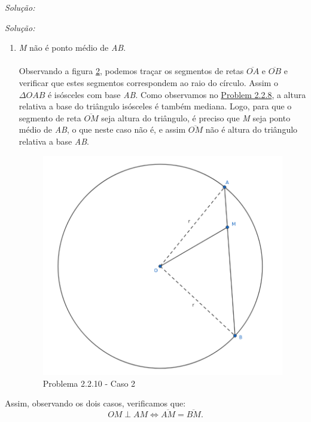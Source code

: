 \documentclass[a4paper, 11pt]{book}
\newenvironment{solution}
    {\textit{Solução:}}
    {}
\begin{document}
\begin{solution}
{\begin{solution}
\begin{enumerate}
\begin{figure}[H]
                \caption{Problema 2.2.10 - Caso 1}
                \label{fig:2.2.10}
            \end{figure}
        \item \textit{M} não é ponto médio de \textit{AB}. \\\\
            Observando a figura \ref{fig:2.2.10.2}, podemos traçar os segmentos de retas $\overline{OA}$ e $\overline{OB}$ e verificar que estes segmentos correspondem ao raio do círculo. Assim o $\Delta OAB$ é isósceles com base  \textit{AB}. Como observamos no \hyperref[prob:2.2.8]{Problem 2.2.8}, a altura relativa a base do triângulo isósceles é também mediana. Logo, para que o segmento de reta $\overline{OM}$ seja altura do triângulo, é preciso que \textit{M} seja ponto médio de \textit{AB}, o que neste caso não é, e assim $\overline{OM}$ não é altura do triângulo relativa a base \textit{AB}.    
            \begin{figure}[H]
                \centering
                \includegraphics[scale=0.4]{imagens/2_2_10_2.png}
                \caption{Problema 2.2.10 - Caso 2}
                \label{fig:2.2.10.2}
            \end{figure}
    \end{enumerate}
    Assim, observando os dois casos, verificamos que:
    \[
    OM \perp AM \Leftrightarrow \overline{AM} = \overline{BM}
    .\] 
\end{solution}

}
\end{solution}
\end{document}
